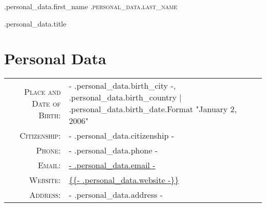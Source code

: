 \begin{center}
    {\Huge {{ .personal_data.first_name }} \textsc{ {{ .personal_data.last_name }} } }
    \smallskip\par{\Large {{ .personal_data.title }} }
\end{center}
\smallskip

\section{Personal Data}
\begin{tabular}{rl}
    \textsc{Place and Date of Birth:} & {{- .personal_data.birth_city -}}, {{ .personal_data.birth_country }} | {{ .personal_data.birth_date.Format "January 2, 2006" }} \\
    \textsc{Citizenship:}             & {{- .personal_data.citizenship -}}                                                                                               \\
    \textsc{Phone:}                   & {{- .personal_data.phone -}}                                                                                                     \\
    \textsc{Email:}                   & \href{mailto: {{- .personal_data.email -}} }{ {{- .personal_data.email -}} }                                                     \\
    \textsc{Website:}                 & \url{ {{- .personal_data.website -}} }                                                                                           \\
    \textsc{Address:}                 & {{- .personal_data.address -}}                                                                                                   \\
\end{tabular}

